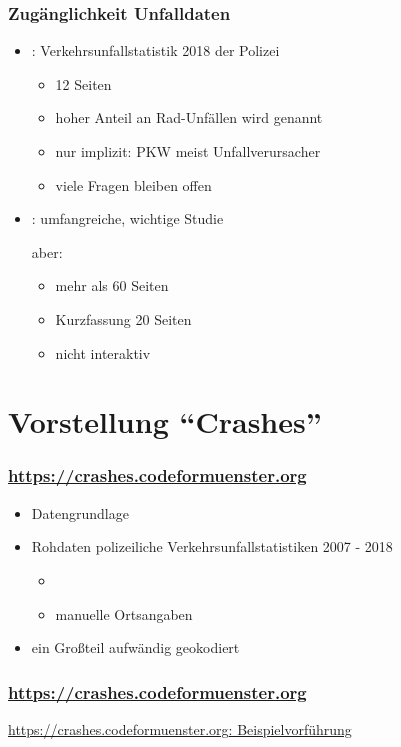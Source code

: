 \documentclass{beamer}
\begin{document}
\begin{frame}
  \frametitle{Zugänglichkeit Unfalldaten}
  
  \begin{itemize}
    \item \cite{Polizei2019}: Verkehrsunfallstatistik 2018 der Polizei
    \begin{itemize}
      \item 12 Seiten
      \item hoher Anteil an Rad-Unfällen wird genannt
      \item nur implizit: PKW meist Unfallverursacher
      \item viele Fragen bleiben offen
    \end{itemize}
    \item \cite{Baier2018}: umfangreiche, wichtige Studie
    \item[aber:]
    \begin{itemize}
      \item mehr als 60 Seiten
      \item Kurzfassung 20 Seiten
      \pause
      \item nicht interaktiv
    \end{itemize}    
  \end{itemize}
\end{frame}

\section{Vorstellung "`Crashes"'}



\begin{frame}
  \frametitle{\url{https://crashes.codeformuenster.org}}
  
  \begin{itemize}
    \item Datengrundlage
    \item Rohdaten polizeiliche Verkehrsunfallstatistiken 2007 - 2018
    \begin{itemize}
      \item 
      \item manuelle Ortsangaben
    \end{itemize}
    \item ein Großteil aufwändig geokodiert
  \end{itemize}
  
\end{frame}

\begin{frame}
  \frametitle{\url{https://crashes.codeformuenster.org}}
  
  \href{beispielpraesentation-crashes.mkv}{\url{https://crashes.codeformuenster.org}: Beispielvorführung}
  
\end{frame}
\end{document}
